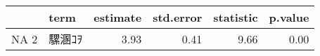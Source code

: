 \begin{tabular}{rlrrrr}
  \hline
 & term & estimate & std.error & statistic & p.value \\ 
  \hline
NA
  2 & 騾溷ｺｦ & 3.93 & 0.41 & 9.66 & 0.00 \\ 
   \hline
\end{tabular}
